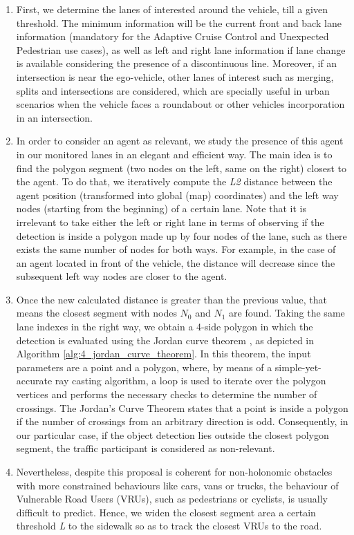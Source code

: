 \begin{enumerate}
	\item First, we determine the lanes of interested around the vehicle, till a given threshold. The minimum information will be the current front and back lane information (mandatory for the Adaptive Cruise Control and Unexpected Pedestrian use cases), as well as left and right lane information if lane change is available considering the presence of a discontinuous line. Moreover, if an intersection is near the ego-vehicle, other lanes of interest such as merging, splits and intersections are considered, which are specially useful in urban scenarios when the vehicle faces a roundabout or other vehicles incorporation in an intersection.
	\item In order to consider an agent as relevant, we study the presence of this agent in our monitored lanes in an elegant and efficient way. The main idea is to find the polygon segment (two nodes on the left, same on the right) closest to the agent. To do that, we iteratively compute the \textit{L2} distance between the agent position (transformed into global (\aka map) coordinates) and the left way nodes (starting from the beginning) of a certain lane. Note that it is irrelevant to take either the left or right lane in terms of observing if the detection is inside a polygon made up by four nodes of the lane, such as there exists the same number of nodes for both ways. For example, in the case of an agent located in front of the vehicle, the distance will decrease since the subsequent left way nodes are closer to the agent. 
	\item Once the new calculated distance is greater than the previous value, that means the closest segment with nodes \textit{$N_0$} and \textit{$N_1$} are found. Taking the same lane indexes in the right way, we obtain a 4-side polygon in which the detection is evaluated using the Jordan curve theorem \cite{tverberg1980proof}, as depicted in Algorithm \ref{alg:4_jordan_curve_theorem}. In this theorem, the input parameters are a point and a polygon, where, by means of a simple-yet-accurate ray casting algorithm, a loop is used to iterate over the polygon vertices and performs the necessary checks to determine the number of crossings. The Jordan's Curve Theorem states that a point is inside a polygon if the number of crossings from an arbitrary direction is odd. Consequently, in our particular case, if the object detection lies outside the closest polygon segment, the traffic participant is considered as non-relevant.
	\item Nevertheless, despite this proposal is coherent for non-holonomic obstacles with more constrained behaviours like cars, vans or trucks, the behaviour of Vulnerable Road Users (VRUs), such as pedestrians or cyclists, is usually difficult to predict. Hence, we widen the closest segment area a certain threshold \textit{L} to the sidewalk so as to track the closest VRUs to the road.
\end{enumerate}


